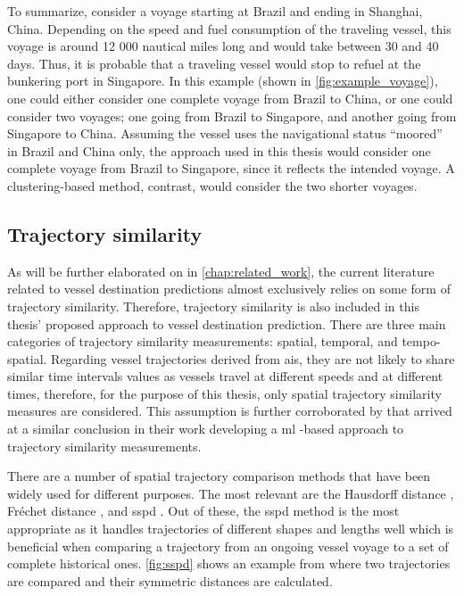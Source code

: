 To summarize, consider a voyage starting at Brazil and ending in Shanghai, China. Depending on the speed and fuel consumption of the traveling vessel, this voyage is around 12 000 nautical miles long and would take between 30 and 40 days. Thus, it is probable that a traveling vessel would stop to refuel at the bunkering port in Singapore. In this example (shown in \cref{fig:example_voyage}), one could either consider one complete voyage from Brazil to China, or one could consider two voyages; one going from Brazil to Singapore, and another going from Singapore to China. Assuming the vessel uses the navigational status ``moored'' in Brazil and China only, the approach used in this thesis would consider one complete voyage from Brazil to Singapore, since it reflects the intended voyage. A  clustering-based method, contrast, would consider the two shorter voyages.

\subsection{Trajectory similarity}
\label{sec:trajectory_similarity}

As will be further elaborated on in \cref{chap:related_work}, the current literature related to vessel destination predictions almost exclusively relies on some form of trajectory similarity. Therefore, trajectory similarity is also included in this thesis' proposed approach to vessel destination prediction. There are three main categories of trajectory similarity measurements: spatial, temporal, and tempo-spatial. Regarding vessel trajectories derived from \acrshort{ais}, they are not likely to share similar time intervals values as vessels travel at different speeds and at different times, therefore, for the purpose of this thesis, only spatial trajectory similarity measures are considered. This assumption is further corroborated by \cite{Zhang2020AISApproach} that arrived at a similar conclusion in their work developing a \acrfull{ml} -based approach to trajectory similarity measurements.

There are a number of spatial trajectory comparison methods that have been widely used for different purposes. The most relevant are the Hausdorff distance \parencite{magdy2015}, Fréchet distance \parencite{magdy2015}, and \acrfull{sspd} \parencite{besse2015review}. Out of these, the \acrshort{sspd} method is the most appropriate as it handles trajectories of different shapes and lengths well which is beneficial when comparing a trajectory from an ongoing vessel voyage to a set of complete historical ones. \cref{fig:sspd} shows an example from \cite{besse2015review} where two trajectories are compared and their symmetric distances are calculated.

